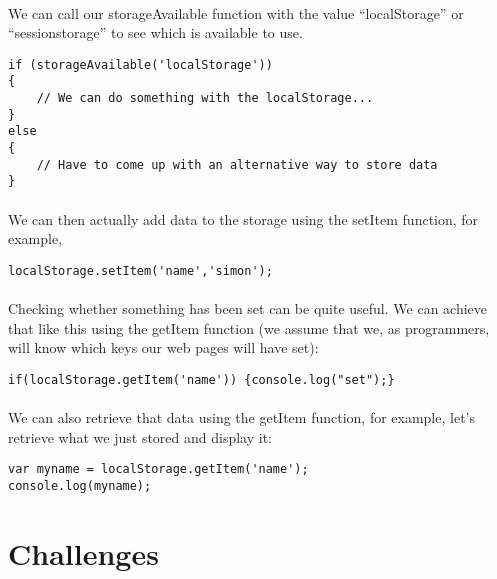 \documentclass[10pt, a4paper]{article}
\begin{document}
\paragraph{} We can call our storageAvailable function with the value ``localStorage'' or ``sessionstorage'' to see which is available to use.
\begin{lstlisting}
if (storageAvailable('localStorage'))
{
    // We can do something with the localStorage...
}
else 
{
    // Have to come up with an alternative way to store data
}
\end{lstlisting}

\paragraph{} We can then actually add data to the storage using the setItem function, for example,
\begin{lstlisting}
localStorage.setItem('name','simon');
\end{lstlisting}
\paragraph{} Checking whether something has been set can be quite useful. We can achieve that like this using the getItem function (we assume that we, as programmers, will know which keys our web pages will have set):

\begin{lstlisting}
if(localStorage.getItem('name')) {console.log("set");}
\end{lstlisting}

\paragraph{} We can also retrieve that data using the getItem function, for example, let's retrieve what we just stored and display it:
\begin{lstlisting}
var myname = localStorage.getItem('name');
console.log(myname);
\end{lstlisting}
\paragraph{}



\section{Challenges}
\end{document}

